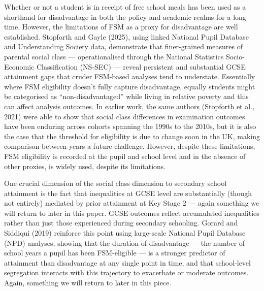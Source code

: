 \documentclass[
  11pt,
]{article}
\begin{document}
Whether or not a student is in receipt of free school meals has been
used as a shorthand for disadvantage in both the policy and academic
realms for a long time. However, the limitations of FSM as a proxy for
disadvantage are well established. Stopforth and Gayle (2025), using
linked National Pupil Database and Understanding Society data,
demonstrate that finer-grained measures of parental social class ---
operationalised through the National Statistics Socio-Economic
Classification (NS-SEC) --- reveal persistent and substantial GCSE
attainment gaps that cruder FSM-based analyses tend to understate.
Essentially where FSM eligibility doesn't fully capture disadvantage,
equally students might be categorised as ``non-disadvantaged'' while
living in relative poverty and this can affect analysis outcomes. In
earlier work, the same authors (Stopforth et al., 2021) were able to
show that social class differences in examination outcomes have been
enduring across cohorts spanning the 1990s to the 2010s, but it is also
the case that the threshold for eligibility is due to change soon in the
UK, making comparison between years a future challenge. However, despite
these limitations, FSM eligibility is recorded at the pupil and school
level and in the absence of other proxies, is widely used, despite its
limitations.

One crucial dimension of the social class dimension to secondary school
attainment is the fact that inequalities at GCSE level are substantially
(though not entirely) mediated by prior attainment at Key Stage 2 ---
again something we will return to later in this paper. GCSE outcomes
reflect accumulated inequalities rather than just those experienced
during secondary schooling. Gorard and Siddiqui (2019) reinforce this
point using large-scale National Pupil Database (NPD) analyses, showing
that the duration of disadvantage --- the number of school years a pupil
has been FSM-eligible --- is a stronger predictor of attainment than
disadvantage at any single point in time, and that school-level
segregation interacts with this trajectory to exacerbate or moderate
outcomes. Again, something we will return to later in this piece.
\end{document}
